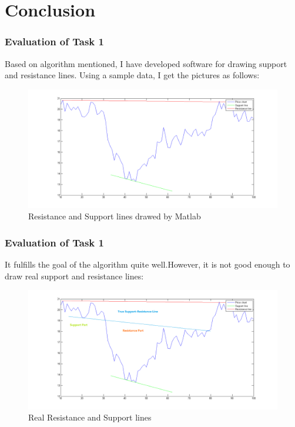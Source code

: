 \documentclass[compress,handout,10pt]{beamer}
\begin{document}
\section{Conclusion}
\begin{frame}
    \frametitle{Evaluation of Task 1}
Based on algorithm mentioned, I have developed software for drawing support and resistance lines. 
Using a sample data, I get the pictures as follows:
\begin{figure}[h]
    \begin{center}
        \includegraphics[width=\textwidth]{images/3.png}
    \end{center}
    \caption{Resistance and Support lines drawed by Matlab}
    \label{fig:rs}
\end{figure}  


\end{frame}

\begin{frame}
    \frametitle{Evaluation of Task 1}
It fulfills the goal of the algorithm quite well.However, it is not good enough to draw real support and resistance lines:
\begin{figure}[h]
    \begin{center}
        \includegraphics[width=\textwidth]{images/4.png}
    \end{center}
    \caption{Real Resistance and Support lines}
    \label{fig:rs}
\end{figure}  
\end{frame}
\end{document}

